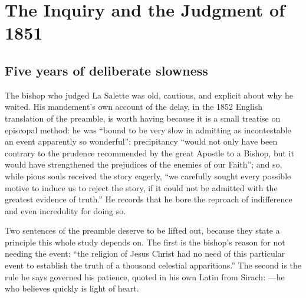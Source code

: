 \section{The Inquiry and the Judgment of 1851}

\subsection{Five years of deliberate slowness}

The bishop who judged La Salette was old, cautious, and explicit
about why he waited. His mandement's own account of the delay,
in the 1852 English translation of the preamble, is worth having
because it is a small treatise on episcopal method: he was ``bound
to be very slow in admitting as incontestable an event apparently so
wonderful''; precipitancy ``would not only have been contrary to the
prudence recommended by the great Apostle to a Bishop, but it would
have strengthened the prejudices of the enemies of our Faith''; and
so, while pious souls received the story eagerly, ``we carefully
sought every possible motive to induce us to reject the story, if it
could not be admitted with the greatest evidence of truth.'' He
records that he bore the reproach of indifference and even
incredulity for doing so.

Two sentences of the preamble deserve to be lifted out, because they
state a principle this whole study depends on. The first is the
bishop's reason for not needing the event: ``the religion of Jesus
Christ had no need of this particular event to establish the truth
of a thousand celestial apparitions.'' The second is the rule he
says governed his patience, quoted in his own Latin from Sirach:
---he who believes quickly is
light of heart.

